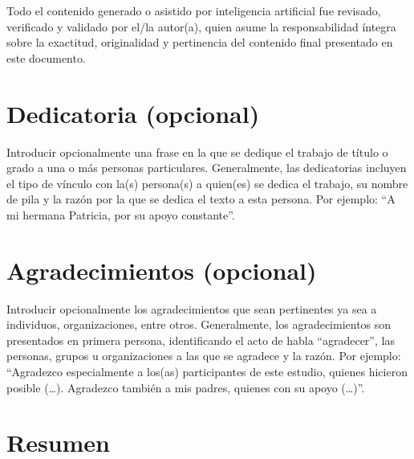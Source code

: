 \documentclass[12pt,letterpaper]{report}
\begin{document}
Todo el contenido generado o asistido por inteligencia artificial fue revisado, verificado y validado por el/la autor(a), quien asume la responsabilidad íntegra sobre la exactitud, originalidad y pertinencia del contenido final presentado en este documento.
\chapter*{Dedicatoria (opcional)}
Introducir opcionalmente una frase en la que se dedique el trabajo de título o grado a una o más personas particulares. Generalmente, las dedicatorias incluyen el tipo de vínculo con la(s) persona(s) a quien(es) se dedica el trabajo, su nombre de pila y la razón por la que se dedica el texto a esta persona. Por ejemplo: ``A mi hermana Patricia, por su apoyo constante''.

\newpage

\chapter*{Agradecimientos (opcional)}
Introducir opcionalmente los agradecimientos que sean pertinentes ya sea a individuos, organizaciones, entre otros. Generalmente, los agradecimientos son presentados en primera persona, identificando el acto de habla ``agradecer'', las personas, grupos u organizaciones a las que se agradece y la razón. Por ejemplo: ``Agradezco especialmente a los(as) participantes de este estudio, quienes hicieron posible (\dots). Agradezco también a mis padres, quienes con su apoyo (\dots)''.

\newpage

\renewcommand{\contentsname}{Índice}
\tableofcontents

\newpage


\chapter*{Resumen}
\end{document}
